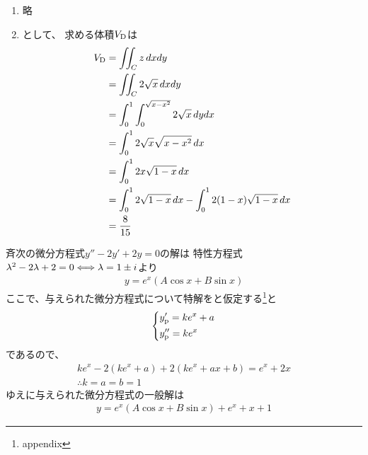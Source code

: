\begin{ans*}
  ${}$
  \begin{enumerate}[label=(\arabic*)]
    \item 略 %
    \item {}として、
    求める体積$V_{\rm{D}}$は
    \begin{align}
      V_{\rm{D}}
      &= \iint_C z\,dxdy \\
      &= \iint_C 2\sqrt{x}\,dxdy \\
      &= \int_{0}^{1}\int_{0}^{\sqrt{x-x^2}} 2\sqrt{x}\,dydx \\
      &= \int_{0}^{1}2\sqrt{x}\sqrt{x-x^2}\,dx \\
      &= \int_{0}^{1} 2x\sqrt{1-x}\,dx \\
      &= \int_{0}^{1} 2\sqrt{1-x}\,dx - \int_{0}^{1}2(1-x)\sqrt{1-x}\,dx \\
      &= \frac{8}{15}
    \end{align}
  \end{enumerate}

\end{ans*}

\begin{ans*}
  斉次の微分方程式$y'' - 2y' + 2y = 0$の解は
  特性方程式$\grl^2 - 2\grl + 2 = 0\Longleftrightarrow \grl = 1\pm i$より
  \begin{gather}
    y = e^x (A\cos x + B\sin x)
  \end{gather}
  ここで、与えられた微分方程式について特解をと仮定する\footnote{appendix}と
  \begin{gather}
    \begin{dcases*}
      y'_{\rm{p}} = ke^x + a \\
      y''_{\rm{p}} = ke^x
    \end{dcases*}
  \end{gather}
  であるので、
  \begin{gather}
    ke^x - 2(ke^x + a) + 2(ke^x + ax + b) = e^x + 2x \\
    \therefore k = a = b = 1
  \end{gather}
  ゆえに与えられた微分方程式の一般解は
  \begin{gather}
    y = e^x(A\cos x + B\sin x) + e^x + x + 1
  \end{gather}
\end{ans*}



